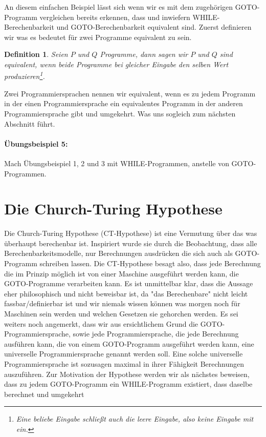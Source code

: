 \documentclass[11pt,a4paper,leqno]{report}
\newtheorem{definition}[theorem]{Definition}
\numberwithin{equation}{chapter}
\begin{document}
An diesem einfachen Beispiel l\"asst sich wenn wir es mit dem zugeh\"origen GOTO-Programm vergleichen bereits erkennen, dass und inwiefern WHILE-Berechenbarkeit und GOTO-Berechenbarkeit equivalent sind. Zuerst definieren wir was es bedeutet f\"ur zwei Programme equivalent zu sein.
\begin{definition}
	Seien $P$ und $Q$ Programme, dann sagen wir $P$ und $Q$ sind equivalent, wenn beide Programme bei gleicher Eingabe den selben Wert produzieren\footnote{Eine beliebe Eingabe schlie\ss{}t auch die leere Eingabe, also keine Eingabe mit ein.}.
\end{definition}
Zwei Programmiersprachen nennen wir equivalent, wenn es zu jedem Programm in der einen Programmiersprache ein equivalentes Programm in der anderen Programmiersprache gibt und umgekehrt. Was uns sogleich zum n\"achsten Abschnitt f\"uhrt.
\paragraph{\"Ubungsbeispiel 5:} Mach \"Ubungsbeispiel 1, 2 und 3 mit WHILE-Programmen, anstelle von GOTO-Programmen.
\section{Die Church-Turing Hypothese}
Die Church-Turing Hypothese (CT-Hypothese) ist eine Vermutung \"uber das was \"uberhaupt berechenbar ist. Inspiriert wurde sie durch die Beobachtung, dass alle Berechenbarkeitsmodelle, nur Berechnungen ausdr\"ucken die sich auch als GOTO-Programm schreiben lassen. Die CT-Hypothese besagt also, dass jede Berechnung die im Prinzip m\"oglich ist von einer Maschine ausgef\"uhrt werden kann, die GOTO-Programme verarbeiten kann. Es ist unmittelbar klar, dass die Aussage eher philosophisch und nicht beweisbar ist, da "das Berechenbare" nicht leicht fassbar/definierbar ist und wir niemals wissen k\"onnen was morgen noch f\"ur Maschinen sein werden und welchen Gesetzen sie gehorchen werden. Es sei weiters noch angemerkt, dass wir aus ersichtlichem Grund die GOTO-Programmiersprache, sowie jede Programmiersprache, die jede Berechnung ausf\"uhren kann, die von einem GOTO-Programm ausgef\"uhrt werden kann, eine universelle Programmiersprache genannt werden soll. Eine solche universelle Programmiersprache ist sozusagen maximal in ihrer F\"ahigkeit Berechnungen auszuf\"uhren. Zur Motivation der Hypothese werden wir als n\"achstes beweisen, dass zu jedem GOTO-Programm ein WHILE-Programm existiert, dass daselbe berechnet und umgekehrt
\end{document}
